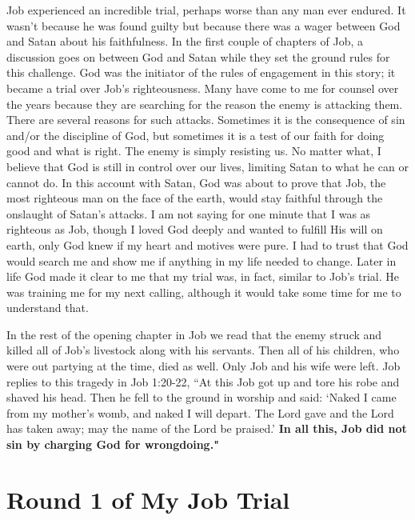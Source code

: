 \documentclass[twoside, 12pt]{book}
\begin{document}
Job experienced an incredible trial, perhaps worse than any man ever endured. It wasn’t because he was found guilty but because there was a wager between God and Satan about his faithfulness. In the first couple of chapters of Job, a discussion goes on between God and Satan while they set the ground rules for this challenge. God was the initiator of the rules of engagement in this story; it became a trial over Job’s righteousness. Many have come to me for counsel over the years because they are searching for the reason the enemy is attacking them. There are several reasons for such attacks. Sometimes it is the consequence of sin and/or the discipline of God, but sometimes it is a test of our faith for doing good and what is right. The enemy is simply resisting us. No matter what, I believe that God is still in control over our lives, limiting Satan to what he can or cannot do. In this account with Satan, God was about to prove that Job, the most righteous man on the face of the earth, would stay faithful through the onslaught of Satan's attacks. I am not saying for one minute that I was as righteous as Job, though I loved God deeply and wanted to fulfill His will on earth, only God knew if my heart and motives were pure. I had to trust that God would search me and show me if anything in my life needed to change. Later in life God made it clear to me that my trial was, in fact, similar to Job's trial. He was training me for my next calling, although it would take some time for me to understand that.

In the rest of the opening chapter in Job we read that the enemy struck and killed all of Job's livestock along with his servants. Then all of his children, who were out partying at the time, died as well. Only Job and his wife were left. Job replies to this tragedy in Job 1:20-22, “At this Job got up and tore his robe and shaved his head. Then he fell to the ground in worship and said: ‘Naked I came from my mother's womb, and naked I will depart. The Lord gave and the Lord has taken away; may the name of the Lord be praised.' \textbf{In all this, Job did not sin by charging God for wrongdoing."}


\section{Round 1 of My Job Trial}
\
\end{document}
